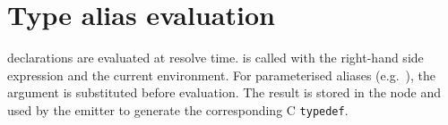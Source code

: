 \section{Type alias evaluation}
\label{sec:ct-typealiases}

\pnum
{} declarations are evaluated at resolve time.
 is called with the right-hand side
expression and the current environment.  For parameterised aliases
(e.g.\ ), the argument is substituted
before evaluation.  The result is stored in the  node
and used by the emitter to generate the corresponding C \texttt{typedef}.
